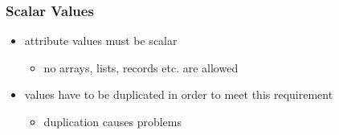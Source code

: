 \documentclass[dvipsnames]{beamer}
\theoremstyle{plain}
\begin{document}
\begin{frame}
  \frametitle{Scalar Values}

  \begin{itemize}
    \item attribute values must be scalar
    \begin{itemize}
      \item no arrays, lists, records etc. are allowed
    \end{itemize}

    \pause
    \item values have to be duplicated in order to meet this requirement
    \begin{itemize}
      \item duplication causes problems
    \end{itemize}
  \end{itemize}
\end{frame}
\end{document}
